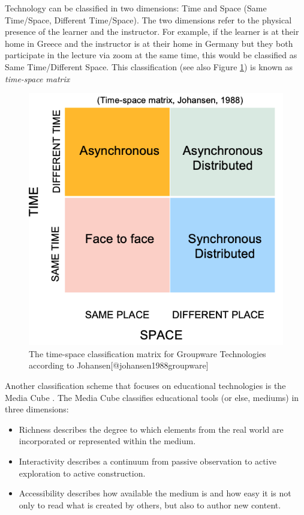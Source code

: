 \documentclass[
]{book}
\providecommand{\tightlist}{%
  \setlength{\itemsep}{0pt}\setlength{\parskip}{0pt}}
\begin{document}
Technology can be classified in two dimensions: Time and Space (Same Time/Space, Different Time/Space). The two dimensions refer to the physical presence of the learner and the instructor. For example, if the learner is at their home in Greece and the instructor is at their home in Germany but they both participate in the lecture via zoom at the same time, this would be classified as Same Time/Different Space.
This classification (see also Figure \ref{fig:timespacematrix}) is known as \emph{time-space matrix} \citep{johansen1988groupware}

\begin{figure}
\includegraphics[width=13cm]{./images/time-space} \caption{The time-space classification matrix for Groupware Technologies according to Johansen[@johansen1988groupware]}\label{fig:timespacematrix}
\end{figure}

Another classification scheme that focuses on educational technologies is the Media Cube \citep{repenning1998learn}. The Media Cube classifies educational tools (or else, mediums) in three dimensions:

\begin{itemize}
\tightlist
\item
  Richness describes the degree to which elements from the real world are incorporated or represented within the medium.
\item
  Interactivity describes a continuum from passive observation to active exploration to active construction.
\item
  Accessibility describes how available the medium is and how easy it is not only to read what is created by others, but also to author new content.
\end{itemize}
\end{document}
